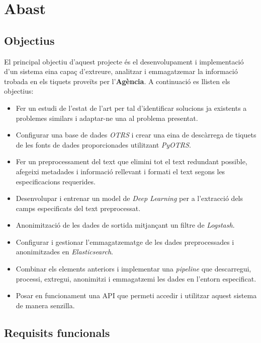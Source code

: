 \section{Abast}

\subsection{Objectius} \label{ssec:objectius}

El principal objectiu d'aquest projecte és el desenvolupament i implementació d'un sistema eina capaç d'extreure, analitzar i emmagatzemar la informació trobada en els tiquets proveïts per l'\textbf{Agència}. A continuació es llisten els objectius:

\begin{itemize}
    \item Fer un estudi de l'estat de l'art per tal d'identificar solucions ja existents a problemes similars i adaptar-ne una al problema presentat.
    \item Configurar una base de dades \textit{OTRS} i crear una eina de descàrrega de tiquets de les fonts de dades proporcionades utilitzant \textit{PyOTRS}.
    \item Fer un preprocessament del text que elimini tot el text redundant possible, afegeixi metadades i informació rellevant i formati el text segons les especificacions requerides.
    \item Desenvolupar i entrenar un model de \textit{Deep Learning} per a l'extracció dels camps especificats del text preprocessat.
    \item Anonimització de les dades de sortida mitjançant un filtre de \textit{Logstash}.
    \item Configurar i gestionar l'emmagatzematge de les dades preprocessades i anonimitzades en \textit{Elasticsearch}.
    \item Combinar els elements anteriors i implementar una \textit{pipeline} que descarregui, processi, extregui, anonimitzi i emmagatzemi les dades en l'entorn especificat.
    \item Posar en funcionament una API que permeti accedir i utilitzar aquest sistema de manera senzilla.
\end{itemize}


\subsection{Requisits funcionals}

